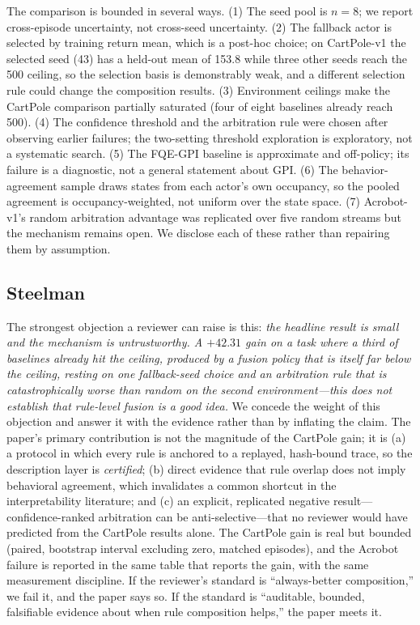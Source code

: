 \documentclass[11pt]{article}
\begin{document}
The comparison is bounded in several ways. (1) The seed pool is $n=8$; we report cross-episode
uncertainty, not cross-seed uncertainty. (2) The fallback actor is selected by training return
mean, which is a post-hoc choice; on CartPole-v1 the selected seed (43) has a held-out mean of
153.8 while three other seeds reach the 500 ceiling, so the selection basis is demonstrably weak,
and a different selection rule could change the composition results. (3) Environment ceilings make
the CartPole comparison partially saturated (four of eight baselines already reach 500). (4) The
confidence threshold and the arbitration rule were chosen after observing earlier failures; the
two-setting threshold exploration is exploratory, not a systematic search. (5) The FQE-GPI baseline
is approximate and off-policy; its failure is a diagnostic, not a general statement about GPI.
(6) The behavior-agreement sample draws states from each actor's own occupancy, so the pooled
agreement is occupancy-weighted, not uniform over the state space. (7) Acrobot-v1's random
arbitration advantage was replicated over five random streams but the mechanism remains open.
We disclose each of these rather than repairing them by assumption.

\subsection{Steelman}
\label{sec:discussion:steelman}

The strongest objection a reviewer can raise is this: \emph{the headline result is small and the
mechanism is untrustworthy. A $+42.31$ gain on a task where a third of baselines already hit the
ceiling, produced by a fusion policy that is itself far below the ceiling, resting on one
fallback-seed choice and an arbitration rule that is catastrophically worse than random on the
second environment---this does not establish that rule-level fusion is a good idea.} We concede the
weight of this objection and answer it with the evidence rather than by inflating the claim. The
paper's primary contribution is not the magnitude of the CartPole gain; it is (a) a protocol in
which every rule is anchored to a replayed, hash-bound trace, so the description layer is
\emph{certified}; (b) direct evidence that rule overlap does not imply behavioral agreement, which
invalidates a common shortcut in the interpretability literature; and (c) an explicit, replicated
negative result---confidence-ranked arbitration can be anti-selective---that no reviewer would have
predicted from the CartPole results alone. The CartPole gain is real but bounded (paired, bootstrap
interval excluding zero, matched episodes), and the Acrobot failure is reported in the same table
that reports the gain, with the same measurement discipline. If the reviewer's standard is
``always-better composition,'' we fail it, and the paper says so. If the standard is ``auditable,
bounded, falsifiable evidence about when rule composition helps,'' the paper meets it.
\end{document}
